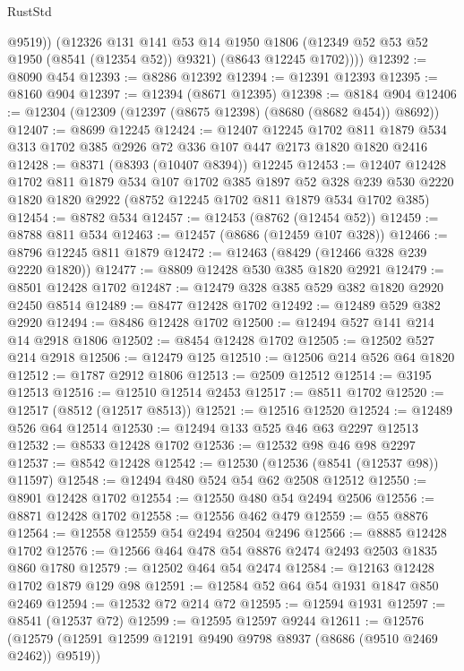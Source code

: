 \begin{lexlean}{RustStd}
\begin{coremodule}
            @9519))
        (@12326
          @131
          @141
          @53
          @14
          @1950
          @1806
          (@12349 @52 @53 @52 @1950 (@8541 (@12354 @52)) @9321)
          (@8643 @12245 @1702))))
@12392 := @8090 @454
@12393 := @8286 @12392
@12394 := @12391 @12393
@12395 := @8160 @904
@12397 := @12394 (@8671 @12395)
@12398 := @8184 @904
@12406 := @12304 (@12309 (@12397 (@8675 @12398) (@8680 (@8682 @454)) @8692))
@12407 := @8699 @12245
@12424 := @12407
    @12245
    @1702
    @811
    @1879
    @534
    @313
    @1702
    @385
    @2926
    @72
    @336
    @107
    @447
    @2173
    @1820
    @1820
    @2416
@12428 := @8371 (@8393 (@10407 @8394)) @12245
@12453 := @12407
    @12428
    @1702
    @811
    @1879
    @534
    @107
    @1702
    @385
    @1897
    @52
    @328
    @239
    @530
    @2220
    @1820
    @1820
    @2922
    (@8752 @12245 @1702 @811 @1879 @534 @1702 @385)
@12454 := @8782 @534
@12457 := @12453 (@8762 (@12454 @52))
@12459 := @8788 @811 @534
@12463 := @12457 (@8686 (@12459 @107 @328))
@12466 := @8796 @12245 @811 @1879
@12472 := @12463 (@8429 (@12466 @328 @239 @2220 @1820))
@12477 := @8809 @12428 @530 @385 @1820 @2921
@12479 := @8501 @12428 @1702
@12487 := @12479 @328 @385 @529 @382 @1820 @2920 @2450 @8514
@12489 := @8477 @12428 @1702
@12492 := @12489 @529 @382 @2920
@12494 := @8486 @12428 @1702
@12500 := @12494 @527 @141 @214 @14 @2918 @1806
@12502 := @8454 @12428 @1702
@12505 := @12502 @527 @214 @2918
@12506 := @12479 @125
@12510 := @12506 @214 @526 @64 @1820
@12512 := @1787 @2912 @1806
@12513 := @2509 @12512
@12514 := @3195 @12513
@12516 := @12510 @12514 @2453
@12517 := @8511 @1702
@12520 := @12517 (@8512 (@12517 @8513))
@12521 := @12516 @12520
@12524 := @12489 @526 @64 @12514
@12530 := @12494 @133 @525 @46 @63 @2297 @12513
@12532 := @8533 @12428 @1702
@12536 := @12532 @98 @46 @98 @2297
@12537 := @8542 @12428
@12542 := @12530 (@12536 (@8541 (@12537 @98)) @11597)
@12548 := @12494 @480 @524 @54 @62 @2508 @12512
@12550 := @8901 @12428 @1702
@12554 := @12550 @480 @54 @2494 @2506
@12556 := @8871 @12428 @1702
@12558 := @12556 @462 @479
@12559 := @55 @8876
@12564 := @12558 @12559 @54 @2494 @2504 @2496
@12566 := @8885 @12428 @1702
@12576 := @12566 @464 @478 @54 @8876 @2474 @2493 @2503 @1835 @860 @1780
@12579 := @12502 @464 @54 @2474
@12584 := @12163 @12428 @1702 @1879 @129 @98
@12591 := @12584 @52 @64 @54 @1931 @1847 @850 @2469
@12594 := @12532 @72 @214 @72
@12595 := @12594 @1931
@12597 := @8541 (@12537 @72)
@12599 := @12595 @12597 @9244
@12611 := @12576 (@12579 (@12591 @12599 @12191 @9490 @9798 @8937 (@8686 (@9510 @2469 @2462)) @9519))

\end{coremodule}
\end{lexlean}
